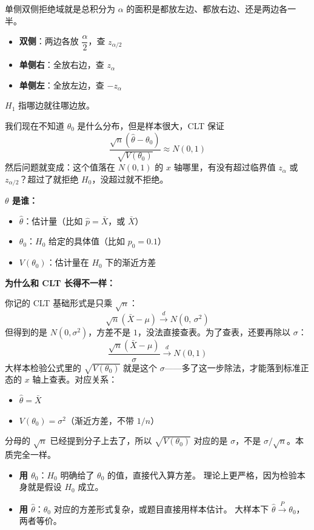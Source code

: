 单侧双侧拒绝域就是总积分为 $\alpha$ 的面积是都放左边、都放右边、还是两边各一半。
\begin{itemize}
    \item \textbf{双侧}：两边各放 $\dfrac{\alpha}{2}$，查 $z_{\alpha/2}$
    \item \textbf{单侧右}：全放右边，查 $z_{\alpha}$
    \item \textbf{单侧左}：全放左边，查 $-z_{\alpha}$
\end{itemize}
$H_1$ 指哪边就往哪边放。
\begin{note}
    我们现在不知道 $\theta_0$ 是什么分布，但是样本很大，CLT 保证
$$\frac{\sqrt{n}(\hat{\theta} - \theta_0)}{\sqrt{V(\theta_0)}} \approx N(0,1)$$
然后问题就变成：这个值落在 $N(0,1)$ 的 $x$ 轴哪里，有没有超过临界值 $z_\alpha$ 或 $z_{\alpha/2}$？超过了就拒绝 $H_0$，没超过就不拒绝。
\end{note}
 \textbf{$\theta$ 是谁：}
\begin{itemize}
    \item $\hat{\theta}$：估计量（比如 $\hat{p} = \bar{X}$，或 $\bar{X}$）
    \item $\theta_0$：$H_0$ 给定的具体值（比如 $p_0 = 0.1$）
    \item $V(\theta_0)$：估计量在 $H_0$ 下的渐近方差
\end{itemize}

\textbf{为什么和 CLT 长得不一样：}

你记的 CLT 基础形式是只乘 $\sqrt{n}$：
$$\sqrt{n}(\bar{X} - \mu) \xrightarrow{d} N(0,\, \sigma^2)$$
但得到的是 $N(0, \sigma^2)$，方差不是 $1$，没法直接查表。为了查表，还要再除以 $\sigma$：
$$\frac{\sqrt{n}(\bar{X} - \mu)}{\sigma} \xrightarrow{d} N(0,1)$$
大样本检验公式里的 $\sqrt{V(\theta_0)}$ 就是这个 $\sigma$——多了这一步除法，才能落到标准正态的 $x$ 轴上查表。对应关系：
\begin{itemize}
    \item $\hat{\theta} = \bar{X}$
    \item $V(\theta_0) = \sigma^2$（渐近方差，不带 $1/n$）
\end{itemize}
分母的 $\sqrt{n}$ 已经提到分子上去了，所以 $\sqrt{V(\theta_0)}$ 对应的是 $\sigma$，不是 $\sigma/\sqrt{n}$。本质完全一样。
\begin{itemize}
    \item \textbf{用 $\theta_0$}：$H_0$ 明确给了 $\theta_0$ 的值，直接代入算方差。
    理论上更严格，因为检验本身就是假设 $H_0$ 成立。
    \item \textbf{用 $\hat{\theta}$}：$\theta_0$ 对应的方差形式复杂，或题目直接用样本估计。
    大样本下 $\hat{\theta} \xrightarrow{P} \theta_0$，两者等价。
\end{itemize}

